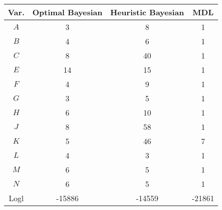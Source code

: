 \scriptsize
\begin{tabular}{cccc}
\toprule
Var.   & Optimal Bayesian & Heuristic Bayesian  & MDL          \\
\midrule
$A$    & 3        & 8                           & 1      \\
$B$    & 4        & 6                           & 1      \\
$C$    & 8        & 40                          & 1      \\
$E$    & 14       & 15                          & 1      \\
$F$    & 4        & 9                           & 1      \\
$G$    & 3        & 5                           & 1      \\
$H$    & 6        & 10                          & 1      \\
$J$    & 8        & 58                          & 1      \\
$K$    & 5        & 46                          & 7      \\
$L$    & 4        & 3                           & 1      \\
$M$    & 6        & 5                           & 1      \\
$N$    & 6        & 5                           & 1      \\
\addlinespace[0.5em]
Logl & -15886   & -14559                      & -21861 \\
\bottomrule
\end{tabular}

